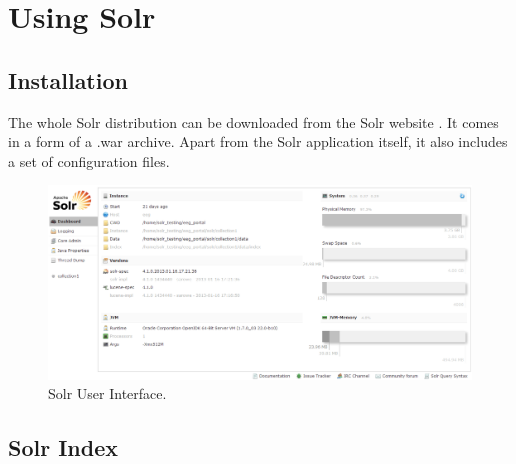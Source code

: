 \section{Using Solr} 



	


\subsection{Installation}

The whole Solr distribution can be downloaded from the Solr website \cite{SolrHome}. 
It comes in a form of a .war archive. 
Apart from the Solr application itself, it also includes a set of configuration files.



\begin{figure}[h]
	\centering
		\includegraphics[width=1.00\textwidth]{figures/solrInterface.png}
	\caption{Solr User Interface.}
	\label{fig:solrInterface}
\end{figure}




\subsection{Solr Index}

